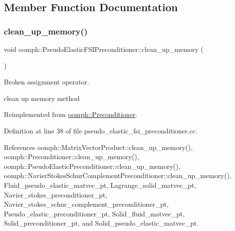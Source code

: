 \subsection{Member Function Documentation}
\mbox{\label{classoomph_1_1PseudoElasticFSIPreconditioner_a15859381010faa40a47fdca28b281475}} 
\subsubsection{\texorpdfstring{clean\+\_\+up\+\_\+memory()}{clean\_up\_memory()}}
{\footnotesize\ttfamily void oomph\+::\+Pseudo\+Elastic\+F\+S\+I\+Preconditioner\+::clean\+\_\+up\+\_\+memory (\begin{DoxyParamCaption}{ }\end{DoxyParamCaption})\hspace{0.3cm}{\ttfamily [virtual]}}



Broken assignment operator. 

clean up memory method 

Reimplemented from \hyperlink{classoomph_1_1Preconditioner_a46c31c416829bedcd9db238431262027}{oomph\+::\+Preconditioner}.



Definition at line 38 of file pseudo\+\_\+elastic\+\_\+fsi\+\_\+preconditioner.\+cc.



References oomph\+::\+Matrix\+Vector\+Product\+::clean\+\_\+up\+\_\+memory(), oomph\+::\+Preconditioner\+::clean\+\_\+up\+\_\+memory(), oomph\+::\+Pseudo\+Elastic\+Preconditioner\+::clean\+\_\+up\+\_\+memory(), oomph\+::\+Navier\+Stokes\+Schur\+Complement\+Preconditioner\+::clean\+\_\+up\+\_\+memory(), Fluid\+\_\+pseudo\+\_\+elastic\+\_\+matvec\+\_\+pt, Lagrange\+\_\+solid\+\_\+matvec\+\_\+pt, Navier\+\_\+stokes\+\_\+preconditioner\+\_\+pt, Navier\+\_\+stokes\+\_\+schur\+\_\+complement\+\_\+preconditioner\+\_\+pt, Pseudo\+\_\+elastic\+\_\+preconditioner\+\_\+pt, Solid\+\_\+fluid\+\_\+matvec\+\_\+pt, Solid\+\_\+preconditioner\+\_\+pt, and Solid\+\_\+pseudo\+\_\+elastic\+\_\+matvec\+\_\+pt.



